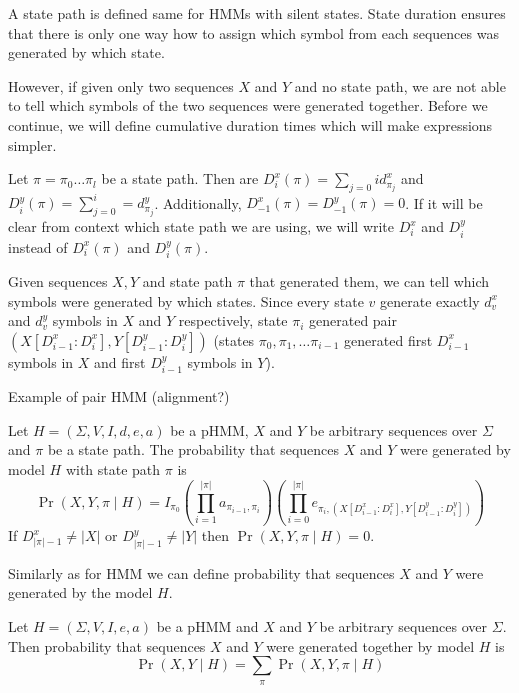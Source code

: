 A state path is defined same for HMMs with silent states. State duration
ensures
that there is only one way how to assign which symbol from each sequences was
generated by which state. 

However, if given only two sequences $X$ and $Y$ and no state path, we are not
able to tell which symbols of the two sequences were generated together. Before
we continue, we will define cumulative duration times which will make
expressions simpler.

\begin{definition}
Let $\pi=\pi_0\dots\pi_l$ be a state path. Then  are
$D^x_i(\pi)=\sum_{j=0}{i}d^x_{\pi_j}$ and $D^y_i(\pi)=\sum_{j=0}^{i}=d^y_{\pi_j}$.
Additionally, $D^x_{-1}(\pi)=D^y_{-1}(\pi)=0$. If it will be clear from context
which state path we are using, we will write $D^x_i$ and $D^y_i$ instead of
$D^x_i(\pi)$ and $D^y_i(\pi)$.
\end{definition}

Given sequences $X,Y$ and state path $\pi$ that generated them, we 
can tell which symbols were generated by which states. Since every state $v$
generate exactly $d^x_v$ and $d^y_v$ symbols in $X$ and $Y$ respectively,
state $\pi_i$ generated pair $(X[D^x_{i-1}:D^x_{i}],Y[D^y_{i-1}:D^y_{i}])$
(states $\pi_0,\pi_1,\dots\pi_{i-1}$ generated first $D^x_{i-1}$ symbols in $X$
and first $D^y_{i-1}$ symbols in $Y$). 


\begin{example}
Example of pair HMM (alignment?)
\end{example}

\begin{definition}
Let $H=(\Sigma,V,I,d,e,a)$ be  a pHMM, $X$ and $Y$ be arbitrary sequences over
$\Sigma$ and $\pi$ be a state path. The probability that sequences $X$ and $Y$
were generated by model $H$  with state path $\pi$ is
\begin{equation}
\Pr\left(X,Y,\pi\mid H\right)=
I_{\pi_0}
\left(
	\prod_{i=1}^{|\pi|}a_{\pi_{i-1},\pi_i}
\right)
\left(
	\prod_{i=0}^{|\pi|}e_{\pi_i,(X[D^x_{i-1}:D^x_{i}],Y[D^y_{i-1}:D^y_{i}])}
\right)
\end{equation}
If $D^x_{|\pi|-1}\not=|X|$ or $D^y_{|\pi|-1}\not=|Y|$ then
$\Pr\left(X,Y,\pi\mid H\right)=0$. 
\end{definition}

Similarly as for HMM we can define probability that sequences $X$ and $Y$ were
generated by the model $H$.

\begin{definition}
Let $H=(\Sigma,V,I,e,a)$ be a pHMM and  $X$ and $Y$ be arbitrary sequences over
$\Sigma$. Then probability that sequences $X$ and $Y$ were generated together by
model $H$ is 
\begin{equation}
\Pr\left(X,Y\mid H\right)=\sum_{\pi}\Pr\left(X,Y,\pi\mid H\right)
\end{equation}
\end{definition}


